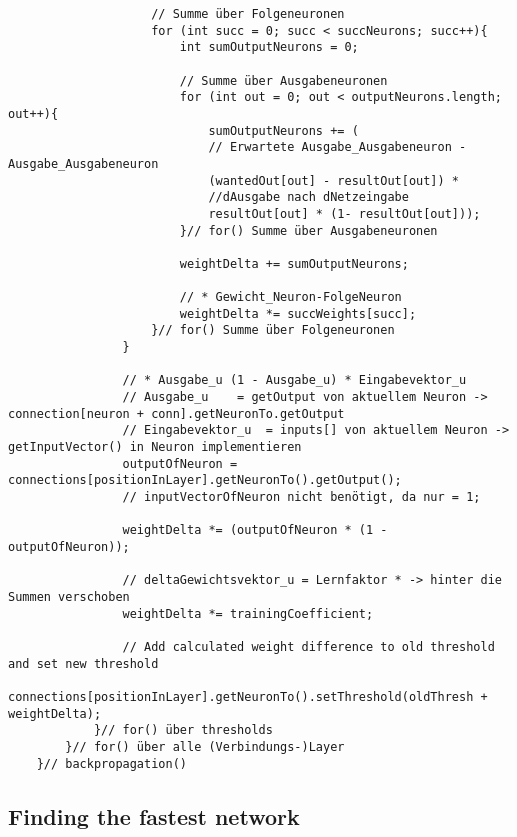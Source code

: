 \begin{lstlisting}
					// Summe über Folgeneuronen
					for (int succ = 0; succ < succNeurons; succ++){
						int sumOutputNeurons = 0;
						
						// Summe über Ausgabeneuronen
						for (int out = 0; out < outputNeurons.length; out++){
							sumOutputNeurons += (
							// Erwartete Ausgabe_Ausgabeneuron - Ausgabe_Ausgabeneuron
							(wantedOut[out] - resultOut[out]) *
							//dAusgabe nach dNetzeingabe
							resultOut[out] * (1- resultOut[out]));
						}// for() Summe über Ausgabeneuronen
				
						weightDelta += sumOutputNeurons;
						
						// * Gewicht_Neuron-FolgeNeuron
						weightDelta *= succWeights[succ];
					}// for() Summe über Folgeneuronen
				}
				
				// * Ausgabe_u (1 - Ausgabe_u) * Eingabevektor_u
				// Ausgabe_u	= getOutput von aktuellem Neuron -> connection[neuron + conn].getNeuronTo.getOutput
				// Eingabevektor_u	= inputs[] von aktuellem Neuron -> getInputVector() in Neuron implementieren				
				outputOfNeuron = connections[positionInLayer].getNeuronTo().getOutput();
				// inputVectorOfNeuron nicht benötigt, da nur = 1;
					
				weightDelta *= (outputOfNeuron * (1 - outputOfNeuron));
					
				// deltaGewichtsvektor_u = Lernfaktor * -> hinter die Summen verschoben
				weightDelta *= trainingCoefficient;
					
				// Add calculated weight difference to old threshold and set new threshold
				connections[positionInLayer].getNeuronTo().setThreshold(oldThresh + weightDelta);
			}// for() über thresholds
		}// for() über alle (Verbindungs-)Layer
	}// backpropagation()
\end{lstlisting}


\subsection{Finding the fastest network}
